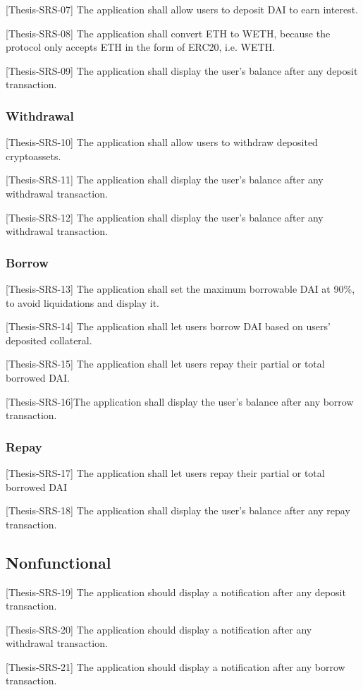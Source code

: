 \documentclass[11pt,a4paper]{report}
\begin{document}
[Thesis-SRS-07] The application shall allow users to deposit DAI to earn interest.

[Thesis-SRS-08] The application shall convert ETH to WETH, because the protocol only accepts ETH in the form of ERC20, i.e. WETH.

[Thesis-SRS-09] The application shall display the user's balance after any deposit transaction.

\subsubsection{Withdrawal}
[Thesis-SRS-10] The application shall allow users to withdraw deposited cryptoassets.

[Thesis-SRS-11] The application shall display the user's balance after any withdrawal transaction.

[Thesis-SRS-12] The application shall display the user's balance after any withdrawal transaction.
\subsubsection{Borrow}
[Thesis-SRS-13] The application shall set the maximum borrowable DAI at 90\%, to avoid liquidations and display it.

[Thesis-SRS-14] The application shall let users borrow DAI based on users' deposited collateral.

[Thesis-SRS-15] The application shall let users repay their partial or total borrowed DAI. 

[Thesis-SRS-16]The application shall display the user's balance after any borrow transaction.
\subsubsection{Repay}
[Thesis-SRS-17] The application shall let users repay their partial or total borrowed DAI 

[Thesis-SRS-18] The application shall display the user's balance after any repay transaction.
\subsection{Nonfunctional}

[Thesis-SRS-19] The application should display a notification after any deposit transaction.

[Thesis-SRS-20] The application should display a notification after any withdrawal transaction.

[Thesis-SRS-21] The application should display a notification after any borrow transaction.
\end{document}
